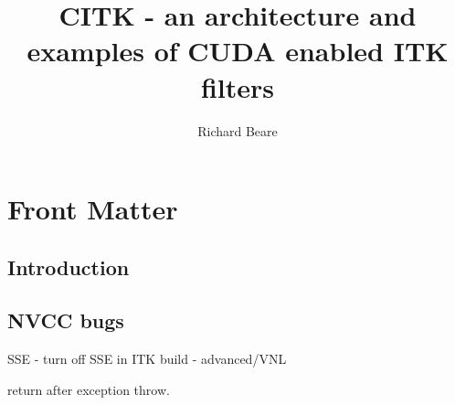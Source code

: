 \documentclass{InsightArticle}
\title{CITK - an architecture and examples of CUDA enabled ITK filters}
\author{Richard Beare}
\begin{document}
\maketitle

\ifhtml
\chapter*{Front Matter\label{front}}
\fi


\begin{abstract}
\noindent
\end{abstract}

\tableofcontents

\section{Introduction}

\section{NVCC bugs}

SSE - turn off SSE in ITK build - advanced/VNL

return after exception throw.



%

\nocite{ITKSoftwareGuide}
\end{document}
